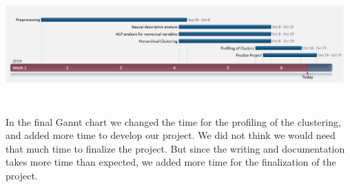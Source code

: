 \begin{center}
  \includegraphics[height=4.5cm, width=13cm]{images/final_gunnt_chart.png}
  \label{fig:gunttfinal}
\end{center}
In the final Gannt chart we changed the time for the profiling of the clustering, and added more time to develop our project. We did not think we would need that much time to finalize the project. But since the writing and documentation takes more time than expected, we added more time for the finalization of the project. 




